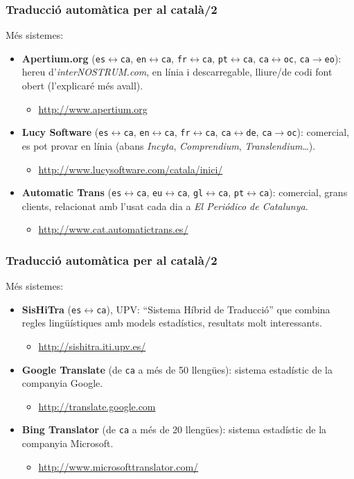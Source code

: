 \documentclass{beamer}
\newcommand{\Pair}[2]{\texttt{#1}\(\leftrightarrow\)\texttt{#2}}
\newcommand{\pair}[2]{\texttt{#1}\(\to\)\texttt{#2}}
\newcommand{\empha}[1]{\emph{#1}\/}
\begin{document}
\begin{frame}
  \frametitle{Traducció automàtica per al català/2}

Més sistemes:
\begin{itemize}
\item \textbf{Apertium.org} (\Pair{es}{ca}, \Pair{en}{ca}, \Pair{fr}{ca}, \Pair{pt}{ca}, \Pair{ca}{oc},  \pair{ca}{eo}): hereu d'\empha{interNOSTRUM.com}, en línia i descarregable, lliure/de codi font obert (l'explicaré més avall).
  \begin{itemize}
  \item \url{http://www.apertium.org}
  \end{itemize}
\item \textbf{Lucy Software} (\Pair{es}{ca}, \Pair{en}{ca}, \Pair{fr}{ca}, \Pair{ca}{de}, \pair{ca}{oc}): comercial, es pot provar en línia (abans \empha{Incyta}, \empha{Comprendium}, \empha{Translendium}\ldots).
  \begin{itemize}
  \item \url{http://www.lucysoftware.com/catala/inici/}
  \end{itemize}
\item \textbf{Automatic Trans} (\Pair{es}{ca}, \Pair{eu}{ca}, \Pair{gl}{ca}, \Pair{pt}{ca}): comercial, grans clients, relacionat amb l'usat cada dia a \empha{El Periódico de Catalunya}.
  \begin{itemize}
  \item \url{http://www.cat.automatictrans.es/}
  \end{itemize}
\end{itemize}

\end{frame}
\begin{frame}
  \frametitle{Traducció automàtica per al català/2}

Més sistemes:
\begin{itemize}
\item \textbf{SisHiTra} (\Pair{es}{ca}), UPV: ``Sistema Híbrid de Traducció'' que combina regles lingüístiques amb models estadístics, resultats molt interessants.
  \begin{itemize}
  \item \url{http://sishitra.iti.upv.es/}
  \end{itemize}
\item \textbf{Google Translate} (de \texttt{ca} a més de 50 llengües): sistema estadístic de la companyia Google.
  \begin{itemize}
  \item \url{http://translate.google.com}
  \end{itemize}
\item \textbf{Bing Translator} (de \texttt{ca} a més de 20 llengües): sistema estadístic de la companyia Microsoft.
  \begin{itemize}
  \item \url{http://www.microsofttranslator.com/}
  \end{itemize}
\end{itemize}

\end{frame}
\end{document}
